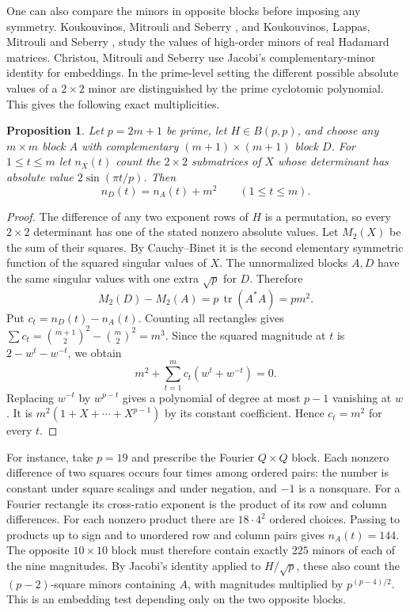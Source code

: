 \documentclass[11pt,a4paper]{article}
\newtheorem{proposition}[theorem]{Proposition}
\numberwithin{equation}{section}
\begin{document}
\medskip
One can also compare the minors in opposite blocks before imposing any symmetry. Koukouvinos, Mitrouli and Seberry \cite{kms1}, and Koukouvinos, Lappas, Mitrouli and Seberry \cite{kms2}, study the values of high-order minors of real Hadamard matrices. Christou, Mitrouli and Seberry \cite{cms18} use Jacobi's complementary-minor identity for embeddings. In the prime-level setting the different possible absolute values of a $2\times2$ minor are distinguished by the prime cyclotomic polynomial. This gives the following exact multiplicities.

\begin{proposition}\label{prime:minor-counts}
Let $p=2m+1$ be prime, let $H\in B(p,p)$, and choose any $m\times m$ block $A$ with complementary $(m+1)\times(m+1)$ block $D$. For $1\le t\le m$ let $n_X(t)$ count the $2\times2$ submatrices of $X$ whose determinant has absolute value $2\sin(\pi t/p)$. Then
$$n_D(t)=n_A(t)+m^2\qquad(1\le t\le m).$$
\end{proposition}
\begin{proof}
The difference of any two exponent rows of $H$ is a permutation, so every $2\times2$ determinant has one of the stated nonzero absolute values. Let $M_2(X)$ be the sum of their squares. By Cauchy--Binet it is the second elementary symmetric function of the squared singular values of $X$. The unnormalized blocks $A,D$ have the same singular values with one extra $\sqrt p$ for $D$. Therefore
$$M_2(D)-M_2(A)=p\,\operatorname{tr}(A^*A)=pm^2.$$
Put $c_t=n_D(t)-n_A(t)$. Counting all rectangles gives $\sum c_t=\binom{m+1}{2}^2-\binom{m}{2}^2=m^3$. Since the squared magnitude at $t$ is $2-w^t-w^{-t}$, we obtain
$$m^2+\sum_{t=1}^{m}c_t(w^t+w^{-t})=0.$$
Replacing $w^{-t}$ by $w^{p-t}$ gives a polynomial of degree at most $p-1$ vanishing at $w$. It is $m^2(1+X+\cdots+X^{p-1})$ by its constant coefficient. Hence $c_t=m^2$ for every $t$.
\end{proof}

For instance, take $p=19$ and prescribe the Fourier $Q\times Q$ block. Each nonzero difference of two squares occurs four times among ordered pairs: the number is constant under square scalings and under negation, and $-1$ is a nonsquare. For a Fourier rectangle its cross-ratio exponent is the product of its row and column differences. For each nonzero product there are $18\cdot4^2$ ordered choices. Passing to products up to sign and to unordered row and column pairs gives $n_A(t)=144$. The opposite $10\times10$ block must therefore contain exactly $225$ minors of each of the nine magnitudes. By Jacobi's identity applied to $H/\sqrt p$, these also count the $(p-2)$-square minors containing $A$, with magnitudes multiplied by $p^{(p-4)/2}$. This is an embedding test depending only on the two opposite blocks.
\end{document}
